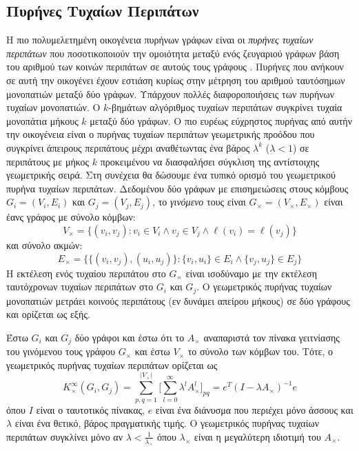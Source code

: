 \subsection{Πυρήνες Τυχαίων Περιπάτων}
Η πιο πολυμελετημένη οικογένεια πυρήνων γράφων είναι οι \textit{πυρήνες τυχαίων περιπάτων} που ποσοτικοποιούν την ομοιότητα μεταξύ ενός ζευγαριού γράφων βάση του αριθμού των κοινών περιπάτων σε αυτούς τους γράφους \cite{kashima2003marginalized,gartner2003graph,mahe2004extensions,borgwardt2005protein,vishwanathan2010graph,sugiyama2015halting}.
Πυρήνες που ανήκουν σε αυτή την οικογένει έχουν εστιάση κυρίως στην μέτρηση του αριθμού ταυτόσημων μονοπατιών μεταξύ δύο γράφων.
Υπάρχουν πολλές διαφοροποιήσεις των πυρήνων τυχαίων μονοπατιών.
Ο $k$-βημάτων αλγόριθμος τυχαίων περιπάτων συγκρίνει τυχαία μονοπάτια μήκους $k$ μεταξύ δύο γράφων.
Ο πιο ευρέως εύχρηστος πυρήνας από αυτήν την οικογένεια είναι ο πυρήνας τυχαίων περιπάτων γεωμετρικής προόδου \cite{gartner2003graph} που συγκρίνει άπειρους περιπάτους μέχρι αναθέτωντας ένα βάρος $\lambda^k$ ($\lambda < 1$) σε περιπάτους με μήκος $k$ προκειμένου να διασφαλήσει σύγκλιση της αντίστοιχης γεωμετρικής σειρά.
Στη συνέχεια θα δώσουμε ένα τυπικό ορισμό του γεωμετρικού πυρήνα τυχαίων περιπάτων.
Δεδομένου δύο γράφων με επισημειώσεις στους κόμβους $G_i=(V_i,E_i)$ και $G_j=(V_j,E_j)$, το \textit{γινόμενο} τους είναι $G_\times=(V_\times,E_\times)$ είναι έανς γράφος με σύνολο κόμβων:
\begin{equation}
	V_{\times} = \{(v_i,v_j) : v_i \in V_i \wedge v_j \in V_j \wedge \ell(v_i) = \ell(v_j) \} 
\end{equation}
και σύνολο ακμών:
\begin{equation}
	E_{\times} = \{\{(v_i,v_j),(u_i,u_j)\} : \{v_i,u_i\} \in E_i \wedge \{v_j,u_j\} \in E_j\}
\end{equation}
Η εκτέλεση ενός τυχαίου περιπάτου στο $G_{\times}$ είναι ισοδύναμο με την εκτέλεση ταυτόχρονων τυχαίων περιπάτων στο $G_i$ και $G_j$.
Ο γεωμετρικός πυρήνας τυχαίων μονοπατιών μετράει κοινούς περιπάτους (εν δυνάμει απείρου μήκους) σε δύο γράφους και ορίζεται ως εξής.	
\begin{definition}
	Έστω $G_i$ και $G_j$ δύο γράφοι και έστω ότι το $A_\times$ αναπαριστά τον πίνακα γειτνίασης του γινόμενου τους γράφου $G_\times$ και έστω $V_\times$ το σύνολο των κόμβων του.
	Τότε, ο γεωμετρικός πυρήνας τυχαίων περιπάτων ορίζεται ως
	\begin{equation}
    	K_{\times}^{\infty}(G_i,G_j) = \sum_{p,q=1}^{|V_{\times}|} \Big[ \sum_{l=0}^{\infty} \lambda^l A_{\times}^l \Big]_{pq} = e^T(I - \lambda A_{\times})^{-1} e
    \end{equation}
	όπου $I$ είναι ο ταυτοτικός πίνακας, $e$ είναι ένα διάνυσμα που περιέχει μόνο άσσους και $\lambda$ είναι ένα θετικό, βάρος πραγματικής τιμής.
	Ο γεωμετρικός πυρήνας τυχαίων περιπάτων συγκλίνει μόνο αν  $\lambda < \frac{1}{\lambda_\times}$ όπου $\lambda_\times$ είναι η μεγαλύτερη ιδιοτιμή του $A_{\times}$.
\end{definition}
